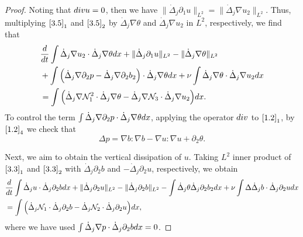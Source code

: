 \documentclass[10pt,a4paper]{amsart}
\numberwithin{equation}{section}
\begin{document}
\begin{proof}
Noting that ${\rm div}u=0$, then we have
$\|\dot{\Delta}_j\partial_1u\|_{L^2}=\|\dot{\Delta}_j\nabla u_2\|_{L^2}$.
Thus, multiplying $\eqref{3.5}_1$ and $\eqref{3.5}_2$ by
$\dot{\Delta}_j\nabla\theta$ and $\dot{\Delta}_j\nabla u_2$ in $L^2$, respectively,
we find that
\begin{equation}\label{3.6}
\begin{aligned}
&\frac{\rm d}{{\rm d}t}\int\dot{\Delta}_j\nabla u_2\cdot\dot{\Delta}_j\nabla\theta
{\rm d}x +\|\dot{\Delta}_j\partial_1 u\|_{L^2}-\|\dot{\Delta}_j\nabla \theta\|_{L^2}\\
&+\int\Big(\dot{\Delta}_j\nabla\partial_2p-\dot{\Delta}_j\nabla\partial_2b_2\Big)
 \cdot\dot{\Delta}_j\nabla\theta{\rm d}x
 +\nu\int\dot{\Delta}_j\nabla\theta\cdot\dot{\Delta}_j\nabla u_2{\rm d}x \\
&=\int\Big(\dot{\Delta}_j\nabla \mathcal{N}_1^2\cdot\dot{\Delta}_j\nabla\theta
 -\dot{\Delta}_j\nabla\mathcal{N}_3\cdot\dot{\Delta}_j\nabla u_2\Big){\rm d}x.
\end{aligned}
\end{equation}
To control the term $\int\dot{\Delta}_j\nabla\partial_2p\cdot\dot{\Delta}_j
 \nabla\theta{\rm d}x$, applying the operator ${\rm div}$ to $\eqref{1.2}_1$, by
$\eqref{1.2}_4$ we check that
\begin{equation}\label{3.7}
 \Delta p=\nabla b:\nabla b-\nabla u:\nabla u+\partial_2\theta.
\end{equation}

Next, we aim to obtain the vertical dissipation of $u$. Taking $L^2$ inner product of
$\eqref{3.3}_1$ and $\eqref{3.3}_2$ with $\dot{\Delta}_j\partial_2b$ and
$-\dot{\Delta}_j\partial_2u$, respectively, we obtain
\begin{equation}\label{3.8}
\begin{aligned}
&\frac{\rm d}{{\rm d}t}\int\dot{\Delta}_j u\cdot\dot{\Delta}_j\partial_2b{\rm d}x
 +\|\dot{\Delta}_j\partial_2 u\|_{L^2}-\|\dot{\Delta}_j\partial_2b\|_{L^2}
 -\int\dot{\Delta}_j\theta\dot{\Delta}_j\partial_2b_2{\rm d}x
 +\nu\int\Delta\dot{\Delta}_jb\cdot\dot{\Delta}_j\partial_2 u{\rm d}x \\
&=\int\Big(\dot{\Delta}_j \mathcal{N}_1\cdot\dot{\Delta}_j\partial_2b
 -\dot{\Delta}_j\mathcal{N}_2\cdot\dot{\Delta}_j\partial_2 u\Big){\rm d}x,
\end{aligned}
\end{equation}
where we have used $\int\dot{\Delta}_j\nabla p\cdot\dot{\Delta}_j\partial_2b{\rm d}x=0$.


\end{proof}
\end{document}
